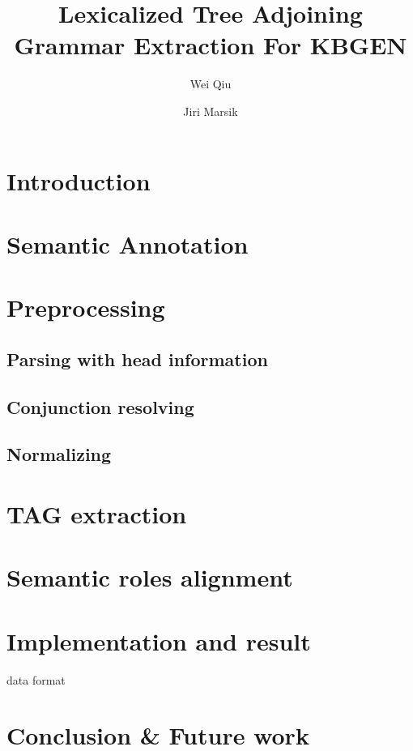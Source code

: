 \documentclass[a4paper]{article}
\title{Lexicalized Tree Adjoining Grammar Extraction For KBGEN}
\author{Wei Qiu \and Jiri Marsik}
\date{}
\begin{document}
\maketitle
\section{Introduction}
\section{Semantic Annotation}
\section{Preprocessing}
\subsection{Parsing with head information}
\subsection{Conjunction resolving}
\subsection{Normalizing}
\section{TAG extraction}
\section{Semantic roles alignment}
\section{Implementation and result}
data format
\section{Conclusion \& Future work}
\end{document}
